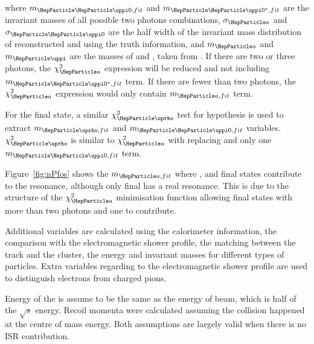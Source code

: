 \documentclass[a4paper,11pt]{article}
\newcommand{\decayRho}{\PGrP{\PGpm\PGpz}\PGnGt}
\newcommand{\decayAiPhoton}{\PaDoP{\PGpm\PGpz\PGpz}\PGnGt}
\newcommand{\decayThreePionPhoton}{\PGpm\PGpm\PGpp\PGpz\PGnGt}
\newcommand{\rootS}{\ensuremath{\sqrt{s}} }
\begin{document}
where $m_{\PGpz,fit}$ and $m_{\PGpz^*,fit}$  are the invariant masses of all possible two photons combinations, $\sigma_{\Pa}$ and $\sigma_{\PGpz}$ are the half width of the invariant mass distribution of reconstructed \Pa and \PGpz using the truth information, and $m_{\Pa}$ and $m_{\PGp}$ are the masses of \Pa and \PGpz, taken from \cite{Agashe:2014kda}. If there are two or three photons, the $\chi_{\Pa}^{2}$ expression will be reduced and not including $m_{\PGpz^*,fit}$ term. If there are fewer than two photons, the $\chi_{\Pa}^{2}$ expression would only contain $m_{\Pa,fit}$ term.


For the \decayRho final state, a similar $\chi_{\PGr}^{2}$ test for \PGr hypothesis is used to extract $m_{\PGr,fit}$ and $m_{\PGpz,fit}$ variables. $\chi_{\PGr}^{2}$ is similar to $\chi_{\Pa}^{2}$ with \PGr replacing \Pa and only one $m_{\PGpz,fit}$ term.


Figure~\ref{fig:nPfos} shows the $m_{\Pa,fit}$ where \decayRho, \decayAiPhoton  and \decayThreePionPhoton final states contribute to the \Pa resonance, although only \decayAiPhoton final has a real \Pa resonance. This is due to the structure of the  $\chi_{\Pa}^{2}$ minimisation function allowing final states with more than two photons and one \PGppm to contribute.

Additional variables are calculated using the calorimeter information, the comparison with the electromagnetic shower profile, the matching between the track and the cluster, the energy and invariant masses for different types of particles. Extra variables regarding to the electromagnetic shower profile are used to distinguish electrons from charged pions.


Energy of the \PGt is assume to be the same as the energy of \Pepm beam, which is half of the \rootS energy. Recoil momenta were calculated assuming the \Pem\Pep collision happened at the centre of mass energy. Both assumptions are largely valid when there is no ISR contribution. %
\end{document}
